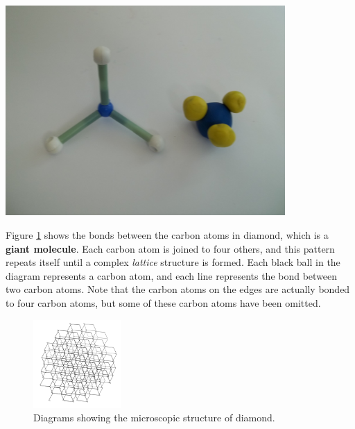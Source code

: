 \begin{enumerate}[noitemsep, label=\textbf{\arabic*}. ]
\begin{itemize}[noitemsep]
\begin{minipage}{.5\textwidth}
\begin{center}
\includegraphics[width=0.8\textwidth]{photos/ammonia.jpg}
\end{center}
\end{minipage}
       \end{itemize} \noindent
Figure \ref{fig:microscopic:diamond} shows the bonds between the carbon atoms in diamond, 
which is a \textbf{giant molecule}. Each carbon atom 
is joined to four others, and this pattern repeats itself until a complex 
\textsl{lattice} structure is formed. Each black 
ball in the diagram represents a carbon atom, and each line represents the bond 
between two carbon atoms. Note that the carbon atoms on the edges are actually 
bonded to four carbon atoms, but some of these carbon atoms have been omitted.
    \setcounter{subfigure}{0}
\begin{figure}[h]
\begin{center}
\includegraphics[width=0.3\textwidth]{photos/Diamond_Carbon.png}
\caption{Diagrams showing the microscopic structure of diamond.}
\label{fig:microscopic:diamond}
\end{center}
\end{figure}
       \end{enumerate}
